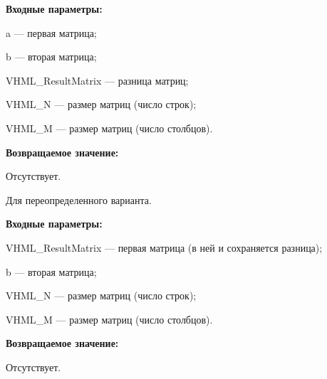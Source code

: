 \textbf{Входные параметры:}

 a --- первая матрица;
 
 b --- вторая матрица;
 
 VHML\_ResultMatrix --- разница матриц;
 
 VHML\_N --- размер матриц (число строк);
 
 VHML\_M --- размер матриц (число столбцов).

\textbf{Возвращаемое значение:}

Отсутствует.

Для переопределенного варианта.

\textbf{Входные параметры:}

 VHML\_ResultMatrix --- первая матрица (в ней и сохраняется разница);
 
 b --- вторая матрица;
 
 VHML\_N --- размер матриц (число строк);
 
 VHML\_M --- размер матриц (число столбцов).
 
 \textbf{Возвращаемое значение:}

Отсутствует.